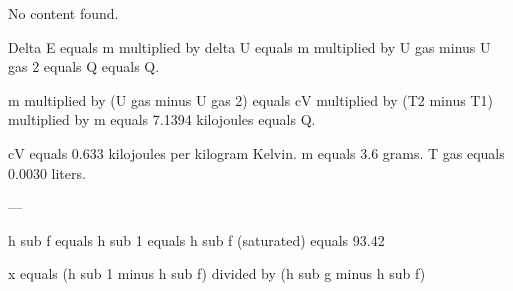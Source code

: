 No content found.

Delta E equals m multiplied by delta U equals m multiplied by U gas minus U gas 2 equals Q equals Q.  

m multiplied by (U gas minus U gas 2) equals cV multiplied by (T2 minus T1) multiplied by m equals 7.1394 kilojoules equals Q.  

cV equals 0.633 kilojoules per kilogram Kelvin.  
m equals 3.6 grams.  
T gas equals 0.0030 liters.  

---

h sub f equals h sub 1 equals h sub f (saturated) equals 93.42  

x equals (h sub 1 minus h sub f) divided by (h sub g minus h sub f)
